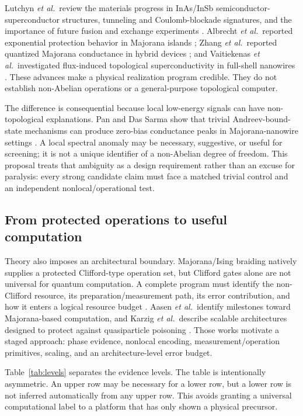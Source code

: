 \documentclass[conference]{IEEEtran}
\begin{document}
Lutchyn \textit{et al.}\ review the materials progress in InAs/InSb semiconductor-superconductor structures, tunneling and Coulomb-blockade signatures, and the importance of future fusion and exchange experiments \cite{lutchyn2018}. Albrecht \textit{et al.}\ reported exponential protection behavior in Majorana islands \cite{albrecht2016}; Zhang \textit{et al.}\ reported quantized Majorana conductance in hybrid devices \cite{zhang2018}; and Vaitiekenas \textit{et al.}\ investigated flux-induced topological superconductivity in full-shell nanowires \cite{vaitiekenas2020}. These advances make a physical realization program credible. They do not establish non-Abelian operations or a general-purpose topological computer.

The difference is consequential because local low-energy signals can have non-topological explanations. Pan and Das Sarma show that trivial Andreev-bound-state mechanisms can produce zero-bias conductance peaks in Majorana-nanowire settings \cite{pan2020}. A local spectral anomaly may be necessary, suggestive, or useful for screening; it is not a unique identifier of a non-Abelian degree of freedom. This proposal treats that ambiguity as a design requirement rather than an excuse for paralysis: every strong candidate claim must face a matched trivial control and an independent nonlocal/operational test.

\subsection{From protected operations to useful computation}

Theory also imposes an architectural boundary. Majorana/Ising braiding natively supplies a protected Clifford-type operation set, but Clifford gates alone are not universal for quantum computation. A complete program must identify the non-Clifford resource, its preparation/measurement path, its error contribution, and how it enters a logical resource budget \cite{bravyi2005}. Aasen \textit{et al.}\ identify milestones toward Majorana-based computation, and Karzig \textit{et al.}\ describe scalable architectures designed to protect against quasiparticle poisoning \cite{aasen2016,karzig2017}. Those works motivate a staged approach: phase evidence, nonlocal encoding, measurement/operation primitives, scaling, and an architecture-level error budget.

Table~\ref{tab:levels} separates the evidence levels. The table is intentionally asymmetric. An upper row may be necessary for a lower row, but a lower row is not inferred automatically from any upper row. This avoids granting a universal computational label to a platform that has only shown a physical precursor.
\end{document}
